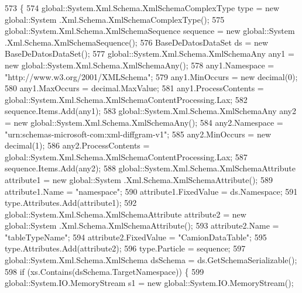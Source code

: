 \begin{DoxyCode}
573                                                                                                            
                               \{
574                 global::System.Xml.Schema.XmlSchemaComplexType type = \textcolor{keyword}{new} global::System
      .Xml.Schema.XmlSchemaComplexType();
575                 global::System.Xml.Schema.XmlSchemaSequence sequence = \textcolor{keyword}{new} global::System
      .Xml.Schema.XmlSchemaSequence();
576                 BaseDeDatosDataSet ds = \textcolor{keyword}{new} BaseDeDatosDataSet();
577                 global::System.Xml.Schema.XmlSchemaAny any1 = \textcolor{keyword}{new} global::System.Xml.Schema.XmlSchemaAny();
578                 any1.Namespace = \textcolor{stringliteral}{"http://www.w3.org/2001/XMLSchema"};
579                 any1.MinOccurs = \textcolor{keyword}{new} decimal(0);
580                 any1.MaxOccurs = decimal.MaxValue;
581                 any1.ProcessContents = global::System.Xml.Schema.XmlSchemaContentProcessing.Lax;
582                 sequence.Items.Add(any1);
583                 global::System.Xml.Schema.XmlSchemaAny any2 = \textcolor{keyword}{new} global::System.Xml.Schema.XmlSchemaAny();
584                 any2.Namespace = \textcolor{stringliteral}{"urn:schemas-microsoft-com:xml-diffgram-v1"};
585                 any2.MinOccurs = \textcolor{keyword}{new} decimal(1);
586                 any2.ProcessContents = global::System.Xml.Schema.XmlSchemaContentProcessing.Lax;
587                 sequence.Items.Add(any2);
588                 global::System.Xml.Schema.XmlSchemaAttribute attribute1 = \textcolor{keyword}{new} global::System
      .Xml.Schema.XmlSchemaAttribute();
589                 attribute1.Name = \textcolor{stringliteral}{"namespace"};
590                 attribute1.FixedValue = ds.Namespace;
591                 type.Attributes.Add(attribute1);
592                 global::System.Xml.Schema.XmlSchemaAttribute attribute2 = \textcolor{keyword}{new} global::System
      .Xml.Schema.XmlSchemaAttribute();
593                 attribute2.Name = \textcolor{stringliteral}{"tableTypeName"};
594                 attribute2.FixedValue = \textcolor{stringliteral}{"CamionDataTable"};
595                 type.Attributes.Add(attribute2);
596                 type.Particle = sequence;
597                 global::System.Xml.Schema.XmlSchema dsSchema = ds.GetSchemaSerializable();
598                 \textcolor{keywordflow}{if} (xs.Contains(dsSchema.TargetNamespace)) \{
599                     global::System.IO.MemoryStream s1 = \textcolor{keyword}{new} global::System.IO.MemoryStream();

\end{DoxyCode}
